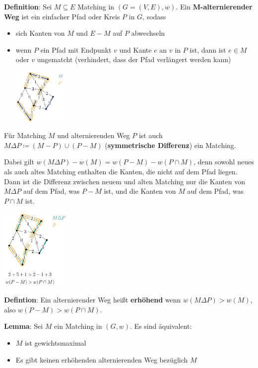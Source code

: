 \bigskip
\textbf{Definition}: Sei $M\subseteq E$ Matching in $(G = (V, E), w)$. Ein \textbf{$\mathbf{M}$-alternierender Weg} ist ein einfacher Pfad oder Kreis $P$ in $G$, sodass
\begin{itemize}
	\item sich Kanten von $M$ und $E- M$ auf $P$ abwechseln
	\item wenn $P$ ein Pfad mit Endpunkt $v$ und Kante $e$ an $v$ in $P$ ist, dann ist $e\in M$ oder $v$ ungematcht (verhindert, dass der Pfad verlängert werden kann)
	\begin{center}
		\includegraphics[width=0.2\textwidth]{images/alternating-path.png}
	\end{center}
\end{itemize}
Für Matching $M$ und alternierenden Weg $P$ ist auch $M\Delta P\coloneqq (M- P)\cup(P-M)$ (\textbf{symmetrische Differenz}) ein Matching.

Dabei gilt $w(M\Delta P)-w(M)=w(P- M)-w(P\cap M)$, denn sowohl neues als auch altes Matching enthalten die Kanten, die nicht auf dem Pfad liegen. Dann ist die Differenz zwischen neuem und alten Matching nur die Kanten von $M\Delta P$ auf dem Pfad, was $P-M$ ist, und die Kanten von $M$ auf dem Pfad, was $P\cap M$ ist.

\begin{center}
	\includegraphics[width=0.25\textwidth]{images/sym-diff.png}
\end{center}
\bigskip
\textbf{Defintion}: Ein alternierender Weg heißt \textbf{erhöhend} wenn $w(M\Delta P)>w(M)$, also $w(P-M)>w(P\cap M)$.\\
\pagebreak

\textbf{Lemma}: Sei $M$ ein Matching in $(G, w)$. Es sind äquivalent:
\begin{itemize}
	\item $M$ ist gewichtsmaximal
	\item Es gibt keinen erhöhenden alternierenden Weg bezüglich $M$
\end{itemize}

